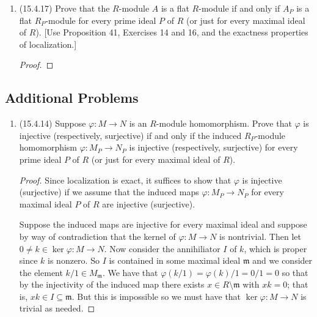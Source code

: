 \documentclass[11pt]{article}
\begin{document}
\begin{enumerate}
\begin{proof}
        The map $\varphi$ is injective. 
    \end{proof}
    \item (15.4.17) Prove that the $R$-module $A$ is a flat $R$-module if and only if $A_P$ is a flat $R_P$-module for every prime ideal $P$ of $R$ (or just for every maximal ideal of $R$). [Use Proposition 41, Exercises 14 and 16, and the exactness properties of localization.] \begin{proof}
        
    \end{proof}
\end{enumerate}
\subsection*{Additional Problems}
\begin{enumerate}
    \item (15.4.14) Suppose $\varphi\colon M\to N$ is an $R$-module homomorphism. Prove that $\varphi$ is injective (respectively, surjective) if and only if the induced $R_P$-module homomorphism $\varphi\colon M_P\to N_P$ is injective (respectively, surjective) for every prime ideal $P$ of $R$ (or just for every maximal ideal of $R$). \begin{proof}
        Since localization is exact, it suffices to show that $\varphi$ is injective (surjective) if we assume that the induced maps $\varphi\colon M_P\to N_P$ for every maximal ideal $P$ of $R$ are injective (surjective).

        Suppose the induced maps are injective for every maximal ideal and suppose by way of contradiction that the kernel of $\varphi\colon M\to N$ is nontrivial. Then let $0\neq k\in \ker \varphi\colon M\to N$. Now consider the annihiliator $I$ of $k$, which is proper since $k$ is nonzero. So $I$ is contained in some maximal ideal $\mathfrak{m}$ and we consider the element $k/1\in M_\mathfrak{m}$. We have that $\varphi(k/1) =\varphi(k)/1 = 0/1 = 0$ so that by the injectivity of the induced map there exists $x\in R\setminus\mathfrak{m}$ with $xk = 0$; that is, $xk\in I\subseteq \mathfrak{m}$. But this is impossible so we must have that $\ker \varphi\colon M\to N$ is trivial as needed.


\end{proof}
\end{enumerate}
\end{document}
